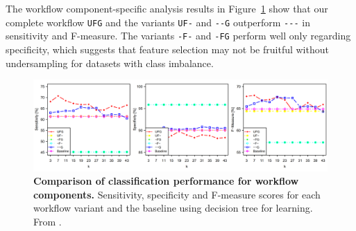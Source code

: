 \documentclass[
  oneside]{book}
\begin{document}
The workflow component-specific analysis results in Figure~\ref{fig:07-perf-wf-components} show that our complete workflow \texttt{UFG} and the variants \texttt{UF-} and \texttt{-\/-G} outperform \texttt{-\/-\/-} in sensitivity and F-measure.
The variants \texttt{-F-} and \texttt{-FG} perform well only regarding specificity, which suggests that feature selection may not be fruitful without undersampling for datasets with class imbalance.



\begin{figure}

{\centering \includegraphics[width=1\linewidth]{figures/07-perf-wf-components} 

}

\caption{\textbf{Comparison of classification performance for workflow components.} Sensitivity, specificity and F-measure scores for each workflow variant and the baseline using decision tree for learning. From \autocite{Niemann:CBMS2015}.}\label{fig:07-perf-wf-components}
\end{figure}
\end{document}
